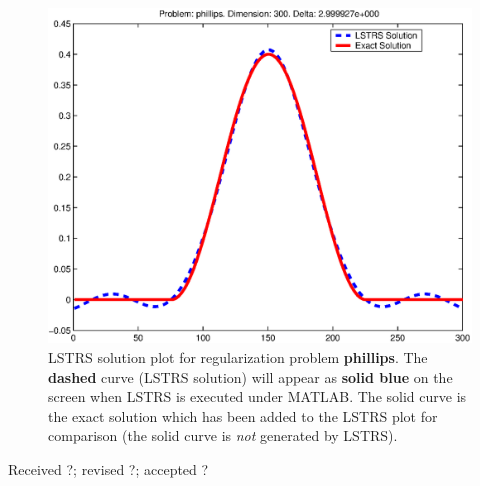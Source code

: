 \documentclass[acmtoms]{acmtrans2m}
\newcommand{\matlab}{MATLAB}
\begin{document}
\begin{figure}[h!tbp]
\centerline{\includegraphics[scale=0.65]{lstrs-phillips.eps}}
\caption{LSTRS solution plot for regularization problem {\bf phillips}. The
{\bf dashed} curve (LSTRS solution) will appear as {\bf solid blue} on the screen when
LSTRS is executed under \matlab.
The solid curve is the exact solution which has been added to the LSTRS plot
for comparison (the solid curve is {\em not} generated by LSTRS).} \label{phillipsplot}
\end{figure}




\begin{received}
Received ?; revised ?; accepted ?
\end{received}
\end{document}
